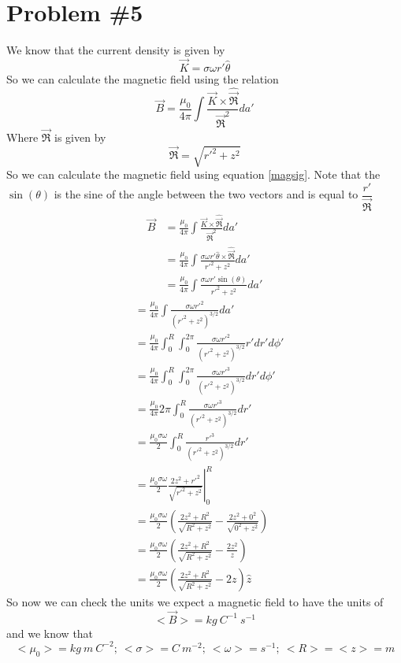 \documentclass[11pt]{article}
\numberwithin{equation}{section}
\newcommand{\scrptR}{\vec{\mathfrak{R}}}
\begin{document}
\section{Problem \#5}
We know that the current density is given by 
$$\vec{K} = \sigma\omega r'\hat{\theta}$$
So we can calculate the magnetic field using the relation
\begin{equation}
\vec{B} = \frac{\mu_0}{4\pi}\int\frac{\vec{K}\times\hat{\scrptR}}{\scrptR^2}da'
\label{magsig}
\end{equation}
Where $\scrptR$ is given by 
$$\scrptR = \sqrt{r'^2+z^2}$$
So we can calculate the magnetic field using equation \ref{magsig}. Note that the $\sin(\theta)$ is the sine of the angle between the two vectors and is equal to $\dfrac{r'}{\scrptR}$
\begin{align*}
\vec{B} &= \frac{\mu_0}{4\pi}\int\frac{\vec{K}\times\hat{\scrptR}}{\scrptR^2}da'\\
&= \frac{\mu_0}{4\pi}\int\frac{\sigma\omega r'\hat{\theta}\times\hat{\scrptR}}{r'^2+z^2}da'\\
&= \frac{\mu_0}{4\pi}\int\frac{\sigma\omega r'\sin(\theta)}{r'^2+z^2}da'
\end{align*}
\begin{align*}
&= \frac{\mu_0}{4\pi}\int\frac{\sigma\omega r'^2}{(r'^2+z^2)^{3/2}}da'\\
&= \frac{\mu_0}{4\pi}\int_0^R\int_0^{2\pi}\frac{\sigma\omega r'^2}{(r'^2+z^2)^{3/2}}r'dr'd\phi'\\
&= \frac{\mu_0}{4\pi}\int_0^R\int_0^{2\pi}\frac{\sigma\omega r'^3}{(r'^2+z^2)^{3/2}}dr'd\phi'\\
&= \frac{\mu_0}{4\pi}2\pi\int_0^R\frac{\sigma\omega r'^3}{(r'^2+z^2)^{3/2}}dr'\\
&= \frac{\mu_0\sigma\omega}{2}\int_0^R\frac{r'^3}{(r'^2+z^2)^{3/2}}dr'\\
&= \frac{\mu_0\sigma\omega}{2}\left.\frac{2z^2+r'^2}{\sqrt{r'^2+z^2}}\right|_0^R\\
&= \frac{\mu_0\sigma\omega}{2}\left(\frac{2z^2+R^2}{\sqrt{R^2+z^2}}-\frac{2z^2+0^2}{\sqrt{0^2+z^2}}\right)\\
&= \frac{\mu_0\sigma\omega}{2}\left(\frac{2z^2+R^2}{\sqrt{R^2+z^2}}-\frac{2z^2}{z}\right)\\
&= \frac{\mu_0\sigma\omega}{2}\left(\frac{2z^2+R^2}{\sqrt{R^2+z^2}}-2z\right)\hat{z}
\end{align*}
So now we can check the units we expect a magnetic field to have the units of
$$<\vec{B}> = kg\ C^{-1}\ s^{-1}$$
and we know that
$$<\mu_0> = kg\ m\ C^{-2};\ <\sigma> = C\ m^{-2};\ <\omega> = s^{-1};\ <R>=<z>=m$$
\end{document}
